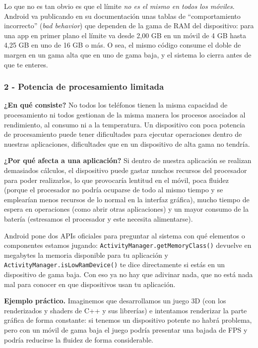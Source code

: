 \documentclass[11pt,a4paper]{article}
\newcommand{\code}[1]{\texttt{\color{navylight}#1}}
\newcommand{\campo}[1]{\textbf{\color{navy}#1}}
\begin{document}
	Lo que no es tan obvio es que el límite \emph{no es el mismo en todos los móviles}. Android va publicando en su documentación unas tablas de \enquote{comportamiento incorrecto} (\emph{bad behavior}) que dependen de la gama de RAM del dispositivo: para una app en primer plano el límite va desde 2,00 GB en un móvil de 4 GB hasta 4,25 GB en uno de 16 GB o más. O sea, el mismo código consume el doble de margen en un gama alta que en uno de gama baja, y el sistema lo cierra antes de que te enteres.
	
	\subsubsection*{2 - Potencia de procesamiento limitada}
	
	\campo{¿En qué consiste?}
	No todos los teléfonos tienen la misma capacidad de procesamiento ni todos gestionan de la misma manera los procesos asociados al rendimiento, al consumo ni a la temperatura. Un dispositivo con poca potencia de procesamiento puede tener dificultades para ejecutar operaciones dentro de nuestras aplicaciones, dificultades que en un dispositivo de alta gama no tendría.
	
	\campo{¿Por qué afecta a una aplicación?}
	Si dentro de nuestra aplicación se realizan demasiados cálculos, el dispositivo puede gastar muchos recursos del procesador para poder realizarlos, lo que provocaría lentitud en el móvil, poca fluidez (porque el procesador no podría ocuparse de todo al mismo tiempo y se emplearían menos recursos de lo normal en la interfaz gráfica), mucho tiempo de espera en operaciones (como abrir otras aplicaciones) y un mayor consumo de la batería (estresamos el procesador y este necesita alimentarse).
	
	Android pone dos APIs oficiales para preguntar al sistema con qué elementos o componentes estamos jugando:
	\code{ActivityManager.getMemoryClass()} devuelve en megabytes la memoria disponible para tu aplicación y \code{ActivityManager.isLowRamDevice()} te dice directamente si estás en un dispositivo de gama baja. Con eso ya no hay que adivinar nada, que no está nada mal para conocer en que dispositivos usan tu aplicación.
	
	\campo{Ejemplo práctico.}
	Imaginemos que desarrollamos un juego 3D (con los renderizados y shaders de C++ y sus librerías) e intentamos renderizar la parte gráfica de forma constante: si tenemos un dispositivo potente no habrá problema, pero con un móvil de gama baja el juego podría presentar una bajada de FPS y podría reducirse la fluidez de forma considerable.
	
\end{document}
